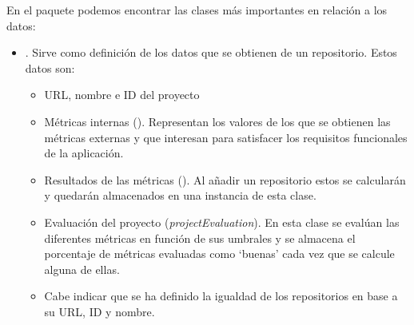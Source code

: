 En el paquete  podemos encontrar las clases más importantes en relación a los datos:
\begin{itemize}
	\item {}. Sirve como definición de los datos que se obtienen de un repositorio. Estos datos son:
	\begin{itemize}
		\item URL, nombre e ID del proyecto
		\item Métricas internas (). Representan los valores de los que se obtienen las métricas externas y que interesan para satisfacer los requisitos funcionales de la aplicación.
		\item Resultados de las métricas (). Al añadir un repositorio estos se calcularán y quedarán almacenados en una instancia de esta clase.
		\item Evaluación del proyecto (\textit{projectEvaluation}). En esta clase se evalúan las diferentes métricas en función de sus umbrales y se almacena el porcentaje de métricas evaluadas como `buenas' cada vez que se calcule alguna de ellas.
		\item Cabe indicar que se ha definido la igualdad de los repositorios en base a su URL, ID y nombre.


\end{itemize}
\end{itemize}

